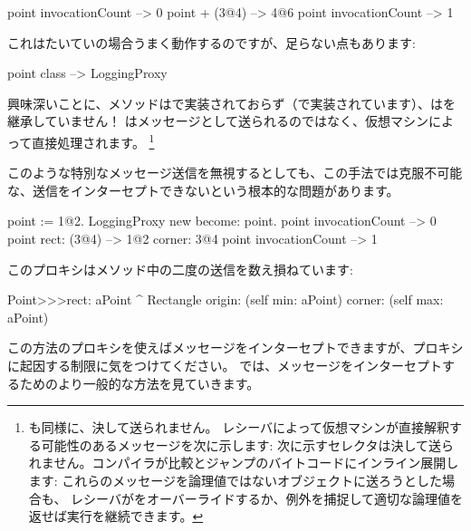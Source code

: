 \documentclass[a4paper,10pt,twoside]{book}
\begin{document}
\begin{code}{}
point invocationCount --> 0
point + (3@4)             --> 4@6
point invocationCount --> 1
\end{code}

これはたいていの場合うまく動作するのですが、足らない点もあります:
\begin{code}{}
point class --> LoggingProxy
\end{code}
興味深いことに、メソッドはで実装されておらず（で実装されています）、はを継承していません！
はメッセージとして送られるのではなく、仮想マシンによって直接処理されます。
\footnote{も同様に、決して送られません。
レシーバによって仮想マシンが直接解釈する可能性のあるメッセージを次に示します:
\ct{+- < > <= >= = ~= * / \ ==}
次に示すセレクタは決して送られません。コンパイラが比較とジャンプのバイトコードにインライン展開します:
これらのメッセージを論理値ではないオブジェクトに送ろうとした場合も、
レシーバがをオーバーライドするか、例外を捕捉して適切な論理値を返せば実行を継続できます。
}%

このような特別なメッセージ送信を無視するとしても、この手法では克服不可能な、\self 送信をインターセプトできないという根本的な問題があります。
\begin{code}{}
point := 1@2.
LoggingProxy new become: point.
point invocationCount --> 0
point rect: (3@4)        --> 1@2 corner: 3@4
point invocationCount --> 1
\end{code}

このプロキシはメソッド中の二度の\self 送信を数え損ねています:
\begin{code}{}
Point>>>rect: aPoint 
	^ Rectangle  origin: (self min: aPoint) corner: (self max: aPoint)
\end{code}

この方法のプロキシを使えばメッセージをインターセプトできますが、プロキシに起因する制限に気をつけてください。
では、メッセージをインターセプトするためのより一般的な方法を見ていきます。

\end{document}
